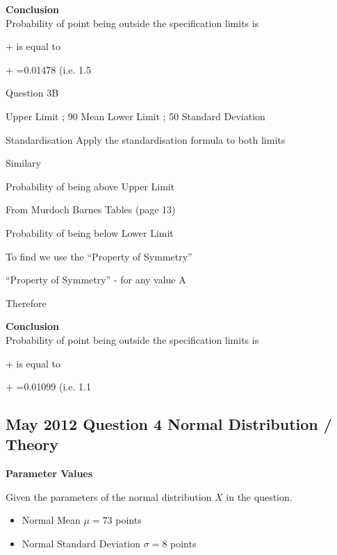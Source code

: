 \noindent \textbf{Conclusion}\\
Probability of point being outside the specification limits is

+ is equal to


+ =0.01478  	(i.e. 1.5%















Question 3B

Upper Limit ; 90		Mean		 	
Lower Limit ; 50		Standard Deviation	 

Standardisation
Apply the standardisation formula	 	to both limits


Similary



Probability of being above Upper Limit

From Murdoch Barnes Tables (page 13)  

Probability of being below Lower Limit


To find   we use the “Property of Symmetry”

“Property of Symmetry” -   for any value A

Therefore 

\noindent \textbf{Conclusion}\\
Probability of point being outside the specification limits is

+ is equal to

+ =0.01099  	(i.e. 1.1%












\subsection{May 2012 Question 4 Normal Distribution / Theory}



\noindent \textbf{Parameter Values}

Given the parameters of the normal distribution $X$ in the question.
\begin{itemize}
	\item Normal Mean $\mu = 73$ points
	\item Normal Standard Deviation $\sigma = 8$ points
\end{itemize}

